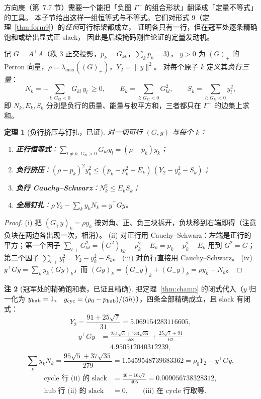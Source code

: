 \documentclass[UTF8,11pt]{ctexart}
\newtheorem{theorem}{定理}[section]
\theoremstyle{definition}
\newtheorem{remark}[theorem]{注}
\begin{document}
方向庚（第~7.7 节）需要一个能把「负图 $\Gamma^-$ 的组合形状」翻译成「定量不等式」的工具。
本子节给出这样一组恒等式与不等式。它们对形式 9（定理~\ref{thm:form9}）的\emph{任何}可行标架都成立，
证明各只有一行，但在冠军处逐条精确饱和或给出显式正 slack，
因此是后续掩码刚性论证的定量发动机。

记 $G=A^\top A$（秩 $3$ 正交投影，$p_k=G_{kk}$，$\sum_kp_k=3$），
$y>0$ 为 $(G)_+$ 的 Perron 向量，$\rho=\lambda_{\max}((G)_+)$，$Y_2=\|y\|^2$。
对每个原子 $k$ 定义其\emph{负行三量}：
\[
N_k=-\!\!\sum_{l:\,G_{kl}<0}\!\!G_{kl}\,y_l\ \ge0,\qquad
E_k=\!\!\sum_{l:\,G_{kl}<0}\!\!G_{kl}^2,\qquad
S_k=\!\!\sum_{l:\,G_{kl}<0}\!\!y_l^2 ,
\]
即 $N_k,E_k,S_k$ 分别是负行的质量、能量与权平方和，三者都只在 $\Gamma^-$ 的边集上求和。

\begin{theorem}[负行挤压与钉扎，已证]\label{thm:squeeze}
对一切可行 $(G,y)$ 与每个 $k$：
\begin{enumerate}[label=(\roman*),leftmargin=2em,itemsep=1pt]
\item \textbf{正行恒等式}：$\sum_{l\ne k,\,G_{kl}>0}G_{kl}y_l=(\rho-p_k)y_k$；
\item \textbf{负行挤压}：$(\rho-p_k)^2y_k^2\le(p_k-p_k^2-E_k)\,(Y_2-y_k^2-S_k)$；
\item \textbf{负行 Cauchy--Schwarz}：$N_k^2\le E_kS_k$；
\item \textbf{全局钉扎}：$\rho\,Y_2-\sum_ky_kN_k=y^\top Gy$。
\end{enumerate}
\end{theorem}

\begin{proof}
(i) 把 $(G_+y)_k=\rho y_k$ 按对角、正、负三块拆开，负块移到右端即得（注意负块在两边各出现一次，相消）。
(ii) 对正行用 Cauchy--Schwarz：左端是正行的平方；第一个因子 $\sum_{l:+}G_{kl}^2=(G^2)_{kk}-p_k^2-E_k=p_k-p_k^2-E_k$
用到 $G^2=G$；第二个因子 $\sum_{l:+}y_l^2=Y_2-y_k^2-S_k$。
(iii) 对负行直接用 Cauchy--Schwarz。
(iv) $y^\top Gy=\sum_ky_k(Gy)_k$，而 $(Gy)_k=(G_+y)_k+(G_-y)_k=\rho y_k-N_k$。
\end{proof}

\begin{remark}[冠军处的精确饱和表，已证且精确]\label{rmk:squeezechamp}
把定理~\ref{thm:champ} 的闭式代入（$y$ 归一化为 $y_{\rm hub}=1$、
$y_{\rm cyc}=(\rho_0-p_{\rm hub})/(5h)$），四条全部精确成立，且 slack 有闭式：
\[
Y_2=\frac{91+25\sqrt7}{31}=5.069154283116605,
\]
\begin{align*}
y^\top Gy&=\frac{251\sqrt5+133\sqrt{35}}{558}+\frac{25\sqrt7+91}{62}\\
&=4.950512040312239,
\end{align*}
\[
\sum_ky_kN_k=\frac{95\sqrt5+37\sqrt{35}}{279}=1.5459548739683362
=\rho_0Y_2-y^\top Gy,
\]
\begin{align*}
\text{cycle 行 (ii) 的 slack}&=\frac{46-16\sqrt7}{405}=0.009056738328312,\\
\text{hub 行 (ii) 的 slack}&=0,\qquad \text{(iii) 在 cycle 行取等}.
\end{align*}
\end{remark}
\end{document}

